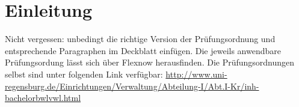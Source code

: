
\chapter{Einleitung}
\label{chap:Einleitung}

Nicht vergessen: unbedingt die richtige Version der Prüfungsordnung und entsprechende Paragraphen im Deckblatt einfügen. Die jeweils anwendbare Prüfungsordung lässt sich über Flexnow herausfinden. Die Prüfungsordnungen selbst sind unter folgenden Link verfügbar: \url{http://www.uni-regensburg.de/Einrichtungen/Verwaltung/Abteilung-I/Abt.I-Kr/inh-bachelorbwlvwl.html}



